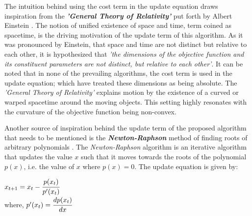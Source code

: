 \documentclass{article}
\begin{document}
The intuition behind using the cost term in the update equation draws inspiration from the \textbf{\textit{'General Theory of Relativity'}} put forth by Albert Einstein \cite{einstein:relativity}. The notion of unified existence of space and time, term coined as spacetime, is the driving motivation of the update term of this algorithm. As it was pronounced by Einstein, that space and time are not distinct but relative to each other, it is hypothesized that \textit{'the dimensions of the objective function and its constituent parameters are not distinct, but relative to each other'}. It can be noted that in none of the prevailing algorithms, the cost term is used in the update equation; which have treated these dimensions as being absolute. The \textit{'General Theory of Relativity'} explains motion by the existence of a curved or warped spacetime around the moving objects. This setting highly resonates with the curvature of the objective function being non-convex.


Another source of inspiration behind the update term of the proposed algorithm that needs to be mentioned is the \textbf{\textit{Newton-Raphson}} method of finding roots of arbitrary polynomials \cite{akram:newton-raphson}. The \textit{Newton-Raphson} algorithm is an iterative algorithm that updates the value $x$ such that it moves towards the roots of the polynomial $p(x)$, i.e. the value of $x$ where $p(x) = 0$. The update equation is given by:

\begin{center}
	$x_{t + 1} = x_{t} - \cfrac{p(x_{t})}{p'(x_{t})}$\\
	where, $p'(x_{t}) = \cfrac{dp(x_{t})}{dx}$
\end{center}
\end{document}
